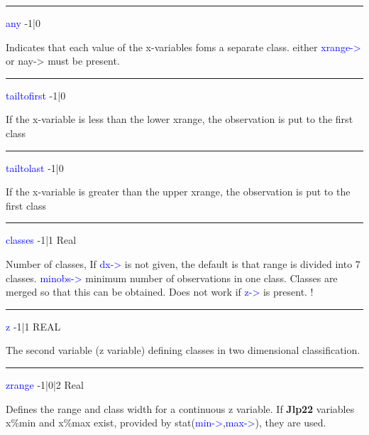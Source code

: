 \vspace{0.3cm}
\hrule
\vspace{0.3cm}
\noindent \textcolor{blue}{any} \tabto{3cm} -1|0 \tabto{5cm}    \tabto{7cm}
\begin{changemargin}{3cm}{0cm}
\noindent Indicates that each value of the x-variables foms a separate class.
either \textcolor{blue}{xrange->} or nay-> must be present.
\end{changemargin}
\vspace{0.3cm}
\hrule
\vspace{0.3cm}
\noindent \textcolor{blue}{tailtofirst} \tabto{3cm} -1|0 \tabto{5cm}   \tabto{7cm}
\begin{changemargin}{3cm}{0cm}
\noindent  If the x-variable is less than the lower xrange, the observation is put to the first class
\end{changemargin}
\vspace{0.3cm}
\hrule
\vspace{0.3cm}
\noindent \textcolor{blue}{tailtolast} \tabto{3cm} -1|0 \tabto{5cm}   \tabto{7cm}
\begin{changemargin}{3cm}{0cm}
\noindent  If the x-variable is greater than the upper xrange, the observation is put to the first class
\end{changemargin}
\vspace{0.3cm}
\hrule
\vspace{0.3cm}
\noindent \textcolor{blue}{classes} \tabto{3cm} -1|1 \tabto{5cm}  Real \tabto{7cm}
\begin{changemargin}{3cm}{0cm}
\noindent  Number of classes, If \textcolor{blue}{dx->} is not given, the default is that range is
divided into 7 classes.
\textcolor{blue}{minobs->} minimum number of observations in one class. Classes are merged so that this can
be obtained. Does not work if \textcolor{blue}{z->} is present.
	!
\end{changemargin}
\vspace{0.3cm}
\hrule
\vspace{0.3cm}
\noindent \textcolor{blue}{z} \tabto{3cm} -1|1 \tabto{5cm}  REAL \tabto{7cm}
\begin{changemargin}{3cm}{0cm}
\noindent  The second variable (z variable) defining classes in two dimensional classification.
\end{changemargin}
\vspace{0.3cm}
\hrule
\vspace{0.3cm}
\noindent \textcolor{blue}{zrange}  \tabto{3cm} -1|0|2 \tabto{5cm}  Real \tabto{7cm}
\begin{changemargin}{3cm}{0cm}
\noindent  Defines the range and class width for a continuous z
variable. If \textbf{Jlp22} variables x\%min and x\%max exist,
provided by \textcolor{VioletRed}{stat}(\textcolor{blue}{min->},\textcolor{blue}{max->}), they are used.
\end{changemargin}
